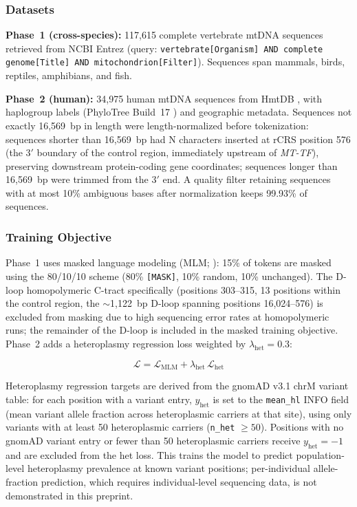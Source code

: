 \documentclass[10pt]{article}
\begin{document}
\subsubsection{Datasets}

\textbf{Phase~1 (cross-species):} 117,615 complete vertebrate mtDNA sequences retrieved from
NCBI Entrez (query: \texttt{vertebrate[Organism] AND complete genome[Title] AND
mitochondrion[Filter]}). Sequences span mammals, birds, reptiles, amphibians, and fish.

\textbf{Phase~2 (human):} 34,975 human mtDNA sequences from HmtDB
\citep{clima2017hmtdb}, with haplogroup labels (PhyloTree Build~17 \citep{vanoven2009phylotree})
and geographic metadata. Sequences not exactly 16,569~bp in length were length-normalized
before tokenization: sequences shorter than 16,569~bp had N characters inserted at rCRS
position 576 (the 3$'$ boundary of the control region, immediately upstream of \emph{MT-TF}),
preserving downstream protein-coding gene coordinates; sequences longer than 16,569~bp were
trimmed from the 3$'$ end. A quality filter retaining sequences with at most
10\% ambiguous bases after normalization keeps 99.93\% of sequences.

\subsubsection{Training Objective}

Phase~1 uses masked language modeling (MLM; \citealt{devlin2018bert}): 15\% of tokens are
masked using the 80/10/10 scheme (80\% \texttt{[MASK]}, 10\% random, 10\% unchanged). The D-loop homopolymeric C-tract specifically (positions 303--315, 13 positions within the
control region, the $\sim$1,122~bp D-loop spanning positions 16,024--576) is excluded from masking
due to high sequencing error rates at homopolymeric
runs; the remainder of the D-loop is included in the masked training objective. Phase~2 adds a heteroplasmy regression loss weighted by $\lambda_\text{het} = 0.3$:

\begin{equation}
\mathcal{L} = \mathcal{L}_\text{MLM} + \lambda_\text{het}\, \mathcal{L}_\text{het}
\end{equation}

Heteroplasmy regression targets are derived from the gnomAD v3.1 chrM variant table: for each
position with a variant entry, $y_\text{het}$ is set to the \texttt{mean\_hl} INFO field (mean
variant allele fraction across heteroplasmic carriers at that site), using only variants with at
least 50 heteroplasmic carriers (\texttt{n\_het} $\geq 50$). Positions with no gnomAD variant
entry or fewer than 50 heteroplasmic carriers receive $y_\text{het} = -1$ and are excluded from
the het loss. This trains the model to predict population-level heteroplasmy prevalence at known
variant positions; per-individual allele-fraction prediction, which requires individual-level
sequencing data, is not demonstrated in this preprint.
\end{document}
